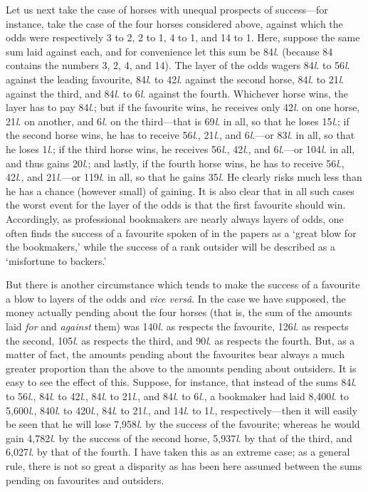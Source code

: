 \documentclass[letterpaper,12pt,oneside,openany]{memoir}
\begin{document}
Let us next take the case of horses with unequal
prospects of success---for instance, take the case of the
four horses considered above, against which the odds
were respectively 3 to 2, 2 to 1, 4 to 1, and 14 to 1.
Here, suppose the same sum laid against each, and for
convenience let this sum be 84\textit{l}. (because 84 contains
the numbers 3, 2, 4, and 14). The layer of the odds
wagers 84\textit{l}. to 56\textit{l}. against the leading favourite, 84\textit{l}. to
42\textit{l}. against the second horse, 84\textit{l}. to 21\textit{l}. against the
third, and 84\textit{l}. to 6\textit{l}. against the fourth. Whichever
horse wins, the layer has to pay 84\textit{l}.; but if the
favourite wins, he receives only 42\textit{l}. on one horse, 21\textit{l}.
on another, and 6\textit{l}. on the third---that is 69\textit{l}. in all, so
that he loses 15\textit{l}.; if the second horse wins, he has to
receive 56\textit{l}., 21\textit{l}., and 6\textit{l}.---or 83\textit{l}. in all, so that he
loses 1\textit{l}.; if the third horse wins, he receives 56\textit{l}., 42\textit{l}.,
and 6\textit{l}.---or 104\textit{l}. in all, and thus gains 20\textit{l}.; and lastly,
if the fourth horse wins, he has to receive 56\textit{l}., 42\textit{l}., and
21\textit{l}.---or 119\textit{l}. in all, so that he gains 35\textit{l}. He clearly
risks much less than he has a chance (however small)
of gaining. It is also clear that in all such cases the
worst event for the layer of the odds is that the
first favourite should win. Accordingly, as professional
bookmakers are nearly always layers of odds, one
often finds the success of a favourite spoken of in the
papers as a `great blow for the bookmakers,' while the
success of a rank outsider will be described as a `misfortune
to backers.'

But there is another circumstance which tends to
make the success of a favourite a blow to layers of the
odds and \emph{vice vers\^a}. In the case we have supposed,
the money actually pending about the four horses
(that is, the sum of the amounts laid \emph{for} and \emph{against}
them) was 140\textit{l}. as respects the favourite, 126\textit{l}. as
respects the second, 105\textit{l}. as respects the third, and
90\textit{l}. as respects the fourth. But, as a matter of fact,
the amounts pending about the favourites bear always
a much greater proportion than the above to the
amounts pending about outsiders. It is easy to see the
effect of this. Suppose, for instance, that instead of
the sums 84\textit{l}. to 56\textit{l}., 84\textit{l}. to 42\textit{l}., 84\textit{l}. to 21\textit{l}., and 84\textit{l}.
to 6\textit{l}., a bookmaker had laid 8,400\textit{l}. to 5,600\textit{l}., 840\textit{l}. to
420\textit{l}., 84\textit{l}. to 21\textit{l}., and 14\textit{l}. to 1\textit{l}., respectively---then
it will easily be seen that he will lose 7,958\textit{l}. by
the success of the favourite; whereas he would gain
4,782\textit{l}. by the success of the second horse, 5,937\textit{l}. by
that of the third, and 6,027\textit{l}. by that of the fourth.
I have taken this as an extreme case; as a general
rule, there is not so great a disparity as has been here
assumed between the sums pending on favourites and
outsiders.
\end{document}
